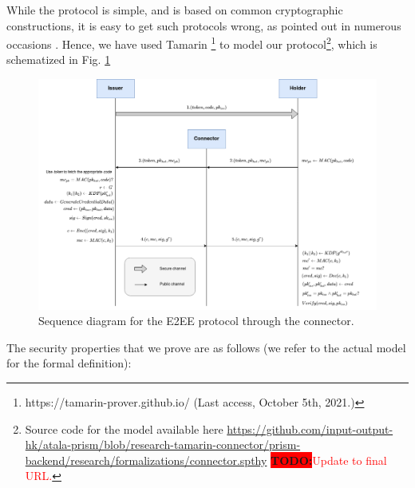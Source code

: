 \documentclass[10pt,a4paper]{article}
\newcommand{\figref}[1]{Fig. \ref{#1}}
\newcommand{\todo}[1]{{\colorbox{red}{\bf TODO:}\textcolor{red}{#1}}}
\begin{document}
While the protocol is simple, and is based on common cryptographic constructions,
it is easy to get such protocols wrong, as pointed out in numerous occasions
\cite{davi01, kraw01}. Hence, we have used Tamarin%
\footnote{https://tamarin-prover.github.io/ (Last access, October 5th, 2021.)}
to model our protocol\footnote{Source code for the model available here
  \url{https://github.com/input-output-hk/atala-prism/blob/research-tamarin-connector/prism-backend/research/formalizations/connector.spthy}
  \todo{Update to final URL.}}, which is schematized in \figref{fig:e2econnector}

\begin{figure}[ht!]
  \centering
  \includegraphics[scale=0.4]{figures/connector.png}
  \caption{Sequence diagram for the E2EE protocol through the connector.}
  \label{fig:e2econnector}%
\end{figure}

The security properties that we prove are as follows (we refer to the actual
model for the formal definition):
\end{document}
